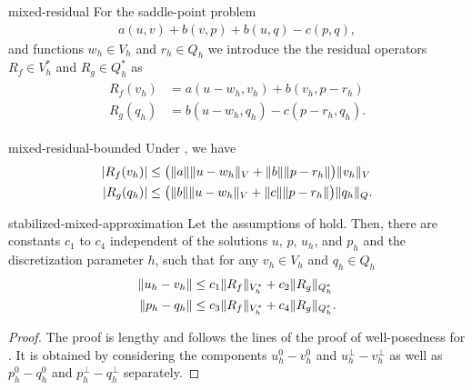\begin{Definition}{mixed-residual}
  For the saddle-point problem
  \begin{gather}
    a(u,v) + b(v,p) + b(u,q) - c(p,q),
  \end{gather}
  and functions $w_h\in V_h$ and $r_h\in Q_h$ we introduce the the
  residual operators $R_f \in V_h^*$ and $R_g\in Q_h^*$ as
  \begin{gather}
    \begin{split}
      R_f(v_h) &= a(u-w_h, v_h) + b(v_h, p-r_h) \\
      R_g(q_h) &= b(u-w_h, q_h) - c(p-r_h, q_h).
    \end{split}
  \end{gather}
\end{Definition}

\begin{Corollary}{mixed-residual-bounded}
  Under , we have
  \begin{gather}
    \begin{split}
      \lvert R_f(v_h)\rvert
      &\le \bigl(\lVert a\rVert \lVert u-w_h\rVert_V + \lVert b\rVert \lVert p-r_h\rVert\bigr)
      \lVert v_h\rVert_V
      \\
      \lvert R_g(q_h)\rvert
      &\le \bigl(\lVert b\rVert \lVert u-w_h\rVert_V + \lVert c\rVert \lVert p-r_h\rVert\bigr)
      \lVert q_h\rVert_Q.
    \end{split}
  \end{gather}
\end{Corollary}

\begin{Lemma}{stabilized-mixed-approximation}
  Let the assumptions of
   hold. Then, there
  are constants $c_1$ to $c_4$ independent of the solutions $u$, $p$,
  $u_h$, and $p_h$ and the discretization parameter $h$, such that for
  any $v_h\in V_h$ and $q_h\in Q_h$
  \begin{gather}
    \label{eq:infsup:16}
    \begin{split}
      \lVert u_h-v_h\rVert &\le c_1 \lVert R_f\rVert_{V_h^*} + c_2
      \lVert R_g\rVert_{Q_h^*}
      \\
      \lVert p_h-q_h\rVert &\le c_3 \lVert R_f\rVert_{V_h^*} + c_4
      \lVert R_g\rVert_{Q_h^*}.
    \end{split}
  \end{gather}
\end{Lemma}

\begin{proof}
  The proof is lengthy and follows the lines of the proof of
  well-posedness for
  . It is obtained by
  considering the components $u_h^0-v_h^0$ and $u_h^\perp-v_h^\perp$
  as well as $p_h^0-q_h^0$ and $p_h^\perp-q_h^\perp$ separately.
\end{proof}

